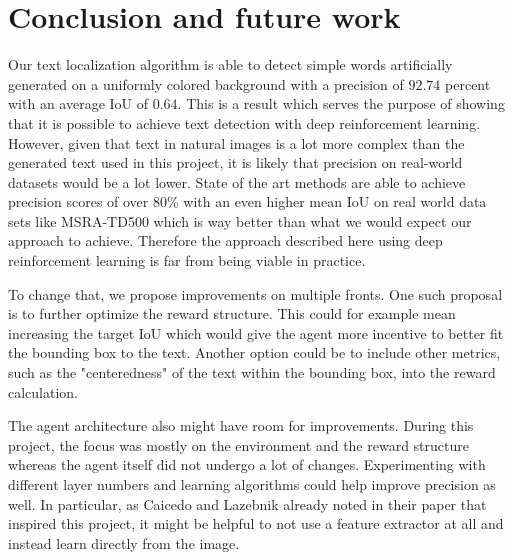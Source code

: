 \section{Conclusion and future work}
Our text localization algorithm is able to detect simple words artificially generated on a uniformly colored background with a  precision of $92.74$ percent with an average IoU of $0.64$.
This is a result which serves the purpose of showing that it is possible to achieve text detection with deep reinforcement learning.
However, given that text in natural images is a lot more complex than the generated text used in this project, it is likely that precision on real-world datasets would be a lot lower.
State of the art methods are able to achieve precision scores of over 80\% with an even higher mean IoU on real world data sets like MSRA-TD500 \cite{DBLP:journals/corr/ZhouYWWZHL17} which is way better than what we would expect our approach to achieve. Therefore the approach described here using deep reinforcement learning is far from being viable in practice. 

To change that, we propose improvements on multiple fronts. One such proposal is to further optimize the reward structure. This could for example mean increasing the target IoU which would give the agent more incentive to better fit the bounding box to the text. Another option could be to include other metrics, such as the "centeredness" of the text within the bounding box, into the reward calculation. 

The agent architecture also might have room for improvements. During this project, the focus was mostly on the environment and the reward structure whereas the agent itself did not undergo a lot of changes. Experimenting with different layer numbers and learning algorithms could help improve precision as well. In particular, as Caicedo and Lazebnik \cite{caicedo2015active} already noted in their paper that inspired this project, it might be helpful to not use a feature extractor at all and instead learn directly from the image.